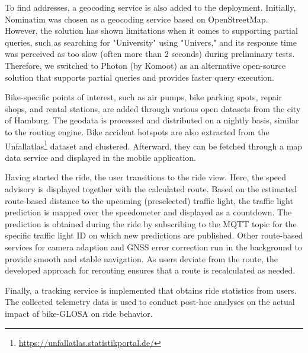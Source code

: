 To find addresses, a geocoding service is also added to the deployment. Initially, Nominatim was chosen as a geocoding service based on OpenStreetMap. However, the solution has shown limitations when it comes to supporting partial queries, such as searching for "University" using "Univers," and its response time was perceived as too slow (often more than 2 seconds) during preliminary tests. Therefore, we switched to Photon (by Komoot) as an alternative open-source solution that supports partial queries and provides faster query execution.

Bike-specific points of interest, such as air pumps, bike parking spots, repair shops, and rental stations, are added through various open datasets from the city of Hamburg. The geodata is processed and distributed on a nightly basis, similar to the routing engine. Bike accident hotspots are also extracted from the Unfallatlas\footnote{\url{https://unfallatlas.statistikportal.de/}} dataset and clustered. Afterward, they can be fetched through a map data service and displayed in the mobile application.

Having started the ride, the user transitions to the ride view. Here, the speed advisory is displayed together with the calculated route. Based on the estimated route-based distance to the upcoming (preselected) traffic light, the traffic light prediction is mapped over the speedometer and displayed as a countdown. The prediction is obtained during the ride by subscribing to the MQTT topic for the specific traffic light ID on which new predictions are published. Other route-based services for camera adaption and GNSS error correction run in the background to provide smooth and stable navigation. As users deviate from the route, the developed approach for rerouting ensures that a route is recalculated as needed.

Finally, a tracking service is implemented that obtains ride statistics from users. The collected telemetry data is used to conduct post-hoc analyses on the actual impact of bike-GLOSA on ride behavior.

